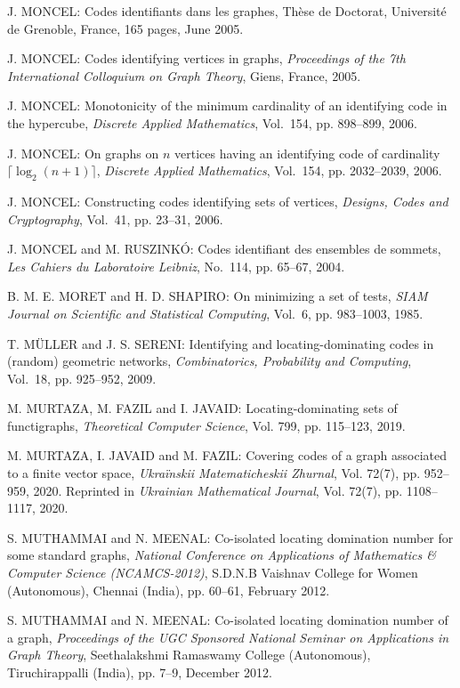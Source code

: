 \begin{thebibliography}{999}
J. MONCEL: Codes identifiants dans les graphes, Th\`ese de
Doctorat, Universit\'e de Grenoble, France, 165 pages, June 2005.

J. MONCEL: Codes identifying vertices in graphs, {\it Proceedings of the 7th International Colloquium on Graph Theory}, Giens, France, 2005.

J. MONCEL: Monotonicity of the minimum cardinality of an identifying code in the hypercube, {\it Discrete Applied Mathematics}, Vol.~154, pp. 898--899, 2006.

J. MONCEL: On graphs on $n$ vertices having an identifying code of cardinality $\lceil \log_2 (n+1)\rceil$, {\it Discrete Applied Mathematics}, Vol.~154, pp. 2032--2039, 2006.

J. MONCEL: Constructing codes identifying sets of vertices, {\it Designs, Codes and Cryptography}, Vol.~41, pp. 23--31, 2006.

J. MONCEL and M. RUSZINK\'O: Codes identifiant des ensembles de sommets, {\it Les Cahiers du Laboratoire Leibniz}, No.~114, pp. 65--67, 2004.

B. M. E. MORET and H. D. SHAPIRO: On minimizing a set of tests, {\it SIAM Journal on Scientific and Statistical Computing}, Vol.~6, pp. 983--1003, 1985. 

T. M\"{U}LLER and J. S. SERENI: Identifying and locating-dominating codes in (random) geometric networks, {\it Combinatorics, Probability and Computing}, Vol.~18, pp. 925--952, 2009.

M. MURTAZA, M. FAZIL and I. JAVAID: Locating-dominating sets of functigraphs, {\it Theoretical Computer Science}, Vol. 799, pp. 115--123, 2019.

M. MURTAZA, I. JAVAID and M. FAZIL: Covering codes of a graph associated to a finite vector space, {\it Ukra\"{i}nskii Matematicheskii Zhurnal}, Vol. 72(7), pp. 952--959, 2020. Reprinted in {\it Ukrainian Mathematical Journal}, Vol. 72(7), pp. 1108--1117, 2020.

S. MUTHAMMAI and N. MEENAL: Co-isolated locating domination number for  some  standard  graphs, {\it National Conference on  Applications of Mathematics \& Computer Science (NCAMCS-2012)}, S.D.N.B  Vaishnav College for Women (Autonomous), Chennai (India), pp.  60--61, February 2012.

S. MUTHAMMAI and N. MEENAL: Co-isolated locating domination number of a  graph, {\it Proceedings of the UGC Sponsored National Seminar on  Applications  in  Graph Theory}, Seethalakshmi  Ramaswamy  College (Autonomous), Tiruchirappalli (India), pp. 7--9, December 2012.


\end{thebibliography}

